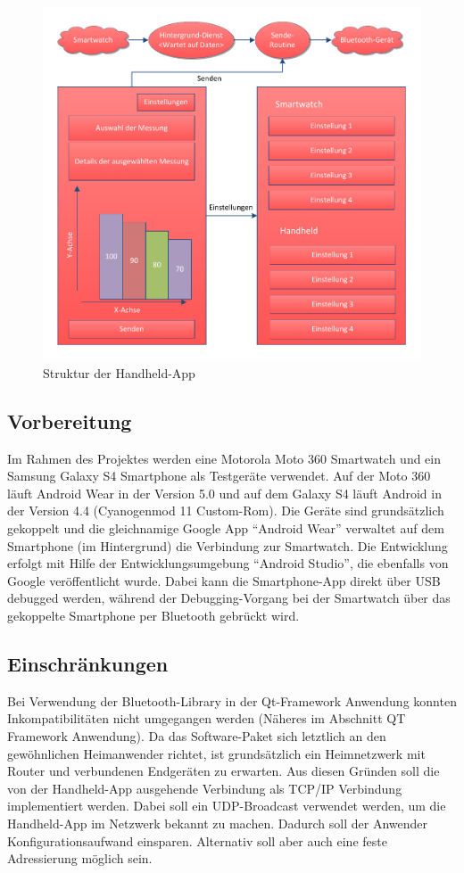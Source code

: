 \bigskip
\begin{figure}[H]
	\centering
	\includegraphics[scale=0.8]{images/strucure_handheld.pdf}
	\caption{Struktur der Handheld-App}
	\label{fig:strucure_handheld}
\end{figure}
\bigskip


\subsection{Vorbereitung}
Im Rahmen des Projektes werden eine Motorola Moto 360 Smartwatch und ein Samsung Galaxy S4 Smartphone als Testgeräte verwendet. Auf der Moto 360 läuft Android Wear in der Version 5.0 und auf dem Galaxy S4 läuft Android in der Version 4.4 (Cyanogenmod 11 Custom-Rom). Die Geräte sind grundsätzlich gekoppelt und die gleichnamige Google App "`Android Wear"' verwaltet auf dem Smartphone (im Hintergrund) die Verbindung zur Smartwatch. Die Entwicklung erfolgt mit Hilfe der Entwicklungsumgebung "`Android Studio"', die ebenfalls von Google veröffentlicht wurde. Dabei kann die Smartphone-App direkt über USB debugged werden, während der Debugging-Vorgang bei der Smartwatch über das gekoppelte Smartphone per Bluetooth gebrückt wird.

\subsection{Einschränkungen}
Bei Verwendung der Bluetooth-Library in der Qt-Framework Anwendung konnten Inkompatibilitäten nicht umgegangen werden (Näheres im Abschnitt QT Framework Anwendung). Da das Software-Paket sich letztlich an den gewöhnlichen Heimanwender richtet, ist grundsätzlich ein Heimnetzwerk mit Router und verbundenen Endgeräten zu erwarten. Aus diesen Gründen soll die von der Handheld-App ausgehende Verbindung als TCP/IP Verbindung implementiert werden. Dabei soll ein UDP-Broadcast verwendet werden, um die Handheld-App im Netzwerk bekannt zu machen. Dadurch soll der Anwender Konfigurationsaufwand einsparen. Alternativ soll aber auch eine feste Adressierung möglich sein.

